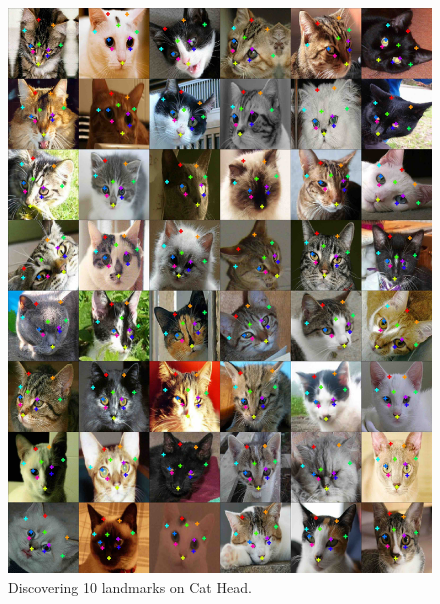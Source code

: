 \begin{figure}[t]
	\centering
	\includegraphics[trim={0cm 0cm 0cm 0cm},clip, width=1.\linewidth]{fig/supp/select48cats}
	\caption{Discovering 10 landmarks on Cat Head.}
	\label{fig:kp_cats}
\end{figure}

